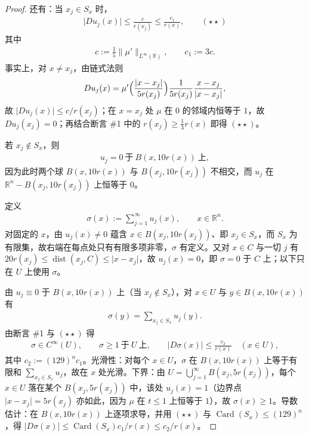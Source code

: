 \documentclass[../../main.tex]{subfiles}%
\begin{document}
\begin{proof}
还有：当 $x_j\in S_x$ 时，
\begin{align*}
\lvert Du_j(x)\rvert\leqslant\frac{c}{r(x_j)}\leqslant\frac{c_1}{r(x)},\qquad(\star\star)
\end{align*}
其中
\begin{align*}
c:=\frac{1}{5}\lVert\mu'\rVert_{L^{\infty}(\mathbb{R})},\qquad c_1:=3c.
\end{align*}
事实上，对 $x\neq x_j$，由链式法则
\begin{align*}
Du_j(x)=\mu'\Bigl(\frac{\lvert x-x_j\rvert}{5r(x_j)}\Bigr)\frac{1}{5r(x_j)}\frac{x-x_j}{\lvert x-x_j\rvert},
\end{align*}
故 $\lvert Du_j(x)\rvert\leqslant c/r(x_j)$；在 $x=x_j$ 处 $\mu$ 在 $0$ 的邻域内恒等于 $1$，故 $Du_j(x_j)=0$；再结合断言 \#1 中的 $r(x_j)\geqslant\frac{1}{3}r(x)$ 即得 $(\star\star)$。

若 $x_j\notin S_x$，则
\begin{align*}
u_j=0\ \text{于}\ B(x,10r(x))\ \text{上},
\end{align*}
因为此时两个球 $B(x,10r(x))$ 与 $B(x_j,10r(x_j))$ 不相交，而 $u_j$ 在 $\mathbb{R}^n-B(x_j,10r(x_j))$ 上恒等于 $0$。

定义
\begin{align*}
\sigma(x):=\sum_{j=1}^{\infty}u_j(x),\qquad x\in\mathbb{R}^n.
\end{align*}
对固定的 $x$，由 $u_j(x)\neq0$ 蕴含 $x\in B(x_j,10r(x_j))$、即 $x_j\in S_x$，而 $S_x$ 为有限集，故右端在每点处只有有限多项非零，$\sigma$ 有定义。又对 $x\in C$ 与一切 $j$ 有 $20r(x_j)\leqslant\operatorname{dist}(x_j,C)\leqslant\lvert x-x_j\rvert$，故 $u_j(x)=0$，即 $\sigma=0$ 于 $C$ 上；以下只在 $U$ 上使用 $\sigma$。

由 $u_j\equiv0$ 于 $B(x,10r(x))$ 上（当 $x_j\notin S_x$），对 $x\in U$ 与 $y\in B(x,10r(x))$ 有
\begin{align*}
\sigma(y)=\sum_{x_j\in S_x}u_j(y).
\end{align*}
由断言 \#1 与 $(\star\star)$ 得
\begin{align*}
\sigma\in C^{\infty}(U),\qquad \sigma\geqslant1\ \text{于}\ U\ \text{上},\qquad \lvert D\sigma(x)\rvert\leqslant\frac{c_2}{r(x)}\quad(x\in U),
\end{align*}
其中 $c_2:=(129)^nc_1$。光滑性：对每个 $x\in U$，$\sigma$ 在 $B(x,10r(x))$ 上等于有限和 $\sum_{x_j\in S_x}u_j$，故在 $x$ 处光滑。下界：由 $U=\bigcup_{j=1}^{\infty}B(x_j,5r(x_j))$，每个 $x\in U$ 落在某个 $B(x_j,5r(x_j))$ 中，该处 $u_j(x)=1$（边界点 $\lvert x-x_j\rvert=5r(x_j)$ 亦如此，因为 $\mu$ 在 $t\leqslant1$ 上恒等于 $1$），故 $\sigma(x)\geqslant1$。导数估计：在 $B(x,10r(x))$ 上逐项求导，并用 $(\star\star)$ 与 $\operatorname{Card}(S_x)\leqslant(129)^n$，得 $\lvert D\sigma(x)\rvert\leqslant\operatorname{Card}(S_x)c_1/r(x)\leqslant c_2/r(x)$。


\end{proof}
\end{document}
